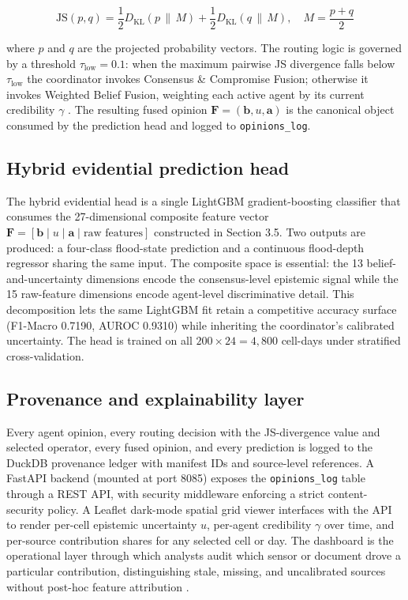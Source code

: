 \begin{equation}
\text{JS}(p, q) = \frac{1}{2} D_{\text{KL}}(p \,\|\, M) + \frac{1}{2} D_{\text{KL}}(q \,\|\, M), \quad M = \frac{p + q}{2}
\label{eq:js_divergence}
\end{equation}

where $p$ and $q$ are the projected probability vectors. The routing logic is governed by a threshold $\tau_{\text{low}} = 0.1$: when the maximum pairwise JS divergence falls below $\tau_{\text{low}}$ the coordinator invokes Consensus \& Compromise Fusion; otherwise it invokes Weighted Belief Fusion, weighting each active agent by its current credibility $\gamma$ \citep{vanderheijden2018multisource, wang2007formal}. The resulting fused opinion $\mathbf{F} = (\mathbf{b}, u, \mathbf{a})$ is the canonical object consumed by the prediction head and logged to \texttt{opinions\_log}.

\subsection{Hybrid evidential prediction head}

The hybrid evidential head is a single LightGBM gradient-boosting classifier that consumes the 27-dimensional composite feature vector $\mathbf{F} = [\mathbf{b} \mid u \mid \mathbf{a} \mid \text{raw features}]$ constructed in Section 3.5. Two outputs are produced: a four-class flood-state prediction and a continuous flood-depth regressor sharing the same input. The composite space is essential: the 13 belief-and-uncertainty dimensions encode the consensus-level epistemic signal while the 15 raw-feature dimensions encode agent-level discriminative detail. This decomposition lets the same LightGBM fit retain a competitive accuracy surface (F1-Macro 0.7190, AUROC 0.9310) while inheriting the coordinator's calibrated uncertainty. The head is trained on all $200 \times 24 = 4,800$ cell-days under stratified cross-validation.

\subsection{Provenance and explainability layer}

Every agent opinion, every routing decision with the JS-divergence value and selected operator, every fused opinion, and every prediction is logged to the DuckDB provenance ledger with manifest IDs and source-level references. A FastAPI backend (mounted at port 8085) exposes the \texttt{opinions\_log} table through a REST API, with security middleware enforcing a strict content-security policy. A Leaflet dark-mode spatial grid viewer interfaces with the API to render per-cell epistemic uncertainty $u$, per-agent credibility $\gamma$ over time, and per-source contribution shares for any selected cell or day. The dashboard is the operational layer through which analysts audit which sensor or document drove a particular contribution, distinguishing stale, missing, and uncalibrated sources without post-hoc feature attribution \citep{hofmeister2024semantic, talemi2026agentic, lee2025multiagent, sandeep2026contextaware, bairamzadeh2025conceptual}.
